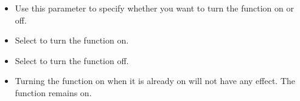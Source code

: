 % 
\begin{itemize}
\item Use this parameter to specify whether you want to turn the function on or off.
\item Select \gdrefbooleantrue{} to turn the function on.
\item Select \gdrefbooleanfalse{} to turn the function off.
\item Turning the function on when it is already on will not have any effect. The function remains on.
\end{itemize}
